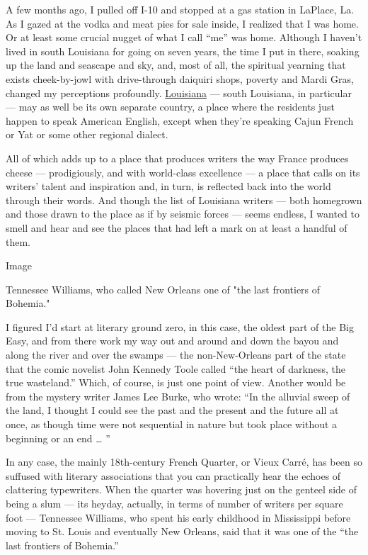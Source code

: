 A few months ago, I pulled off I-10 and stopped at a gas station in
LaPlace, La. As I gazed at the vodka and meat pies for sale inside, I
realized that I was home. Or at least some crucial nugget of what I call
``me'' was home. Although I haven't lived in south Louisiana for going
on seven years, the time I put in there, soaking up the land and
seascape and sky, and, most of all, the spiritual yearning that exists
cheek-by-jowl with drive-through daiquiri shops, poverty and Mardi Gras,
changed my perceptions profoundly.
\href{http://www.nytimes3xbfgragh.onion/travel/guides/north-america/united-states/louisiana/overview.html}{Louisiana}
--- south Louisiana, in particular --- may as well be its own separate
country, a place where the residents just happen to speak American
English, except when they're speaking Cajun French or Yat or some other
regional dialect.

All of which adds up to a place that produces writers the way France
produces cheese --- prodigiously, and with world-class excellence --- a
place that calls on its writers' talent and inspiration and, in turn, is
reflected back into the world through their words. And though the list
of Louisiana writers --- both homegrown and those drawn to the place as
if by seismic forces --- seems endless, I wanted to smell and hear and
see the places that had left a mark on at least a handful of them.

Image

Tennessee Williams, who called New Orleans one of "the last frontiers of
Bohemia."

I figured I'd start at literary ground zero, in this case, the oldest
part of the Big Easy, and from there work my way out and around and down
the bayou and along the river and over the swamps --- the
non-New-Orleans part of the state that the comic novelist John Kennedy
Toole called ``the heart of darkness, the true wasteland.'' Which, of
course, is just one point of view. Another would be from the mystery
writer James Lee Burke, who wrote: ``In the alluvial sweep of the land,
I thought I could see the past and the present and the future all at
once, as though time were not sequential in nature but took place
without a beginning or an end \ldots{} ''

In any case, the mainly 18th-century French Quarter, or Vieux Carré, has
been so suffused with literary associations that you can practically
hear the echoes of clattering typewriters. When the quarter was hovering
just on the genteel side of being a slum --- its heyday, actually, in
terms of number of writers per square foot --- Tennessee Williams, who
spent his early childhood in Mississippi before moving to St. Louis and
eventually New Orleans, said that it was one of the ``the last frontiers
of Bohemia.''

